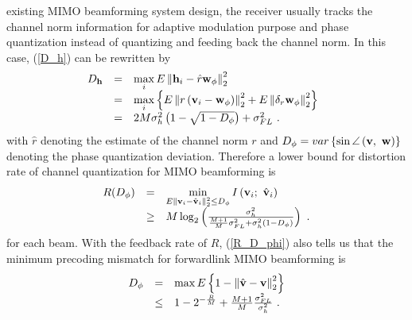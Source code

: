 \documentclass[10pt,fleqn, twocolumn]{IEEEtran}
\newcommand{\bh}{{\bf h}}
\newcommand{\bv}{{\bf v}}
\newcommand{\bw}{{\bf w}}
\begin{document}
existing MIMO beamforming system design, the receiver usually
tracks the channel norm information for adaptive modulation
purpose and phase quantization instead of quantizing and feeding
back the channel norm. In this case, (\ref{D_h}) can be rewritten
by
\begin{equation}\hspace{-0.10in}
\begin{array}{rcl}
D_{\bh}&=&\max\limits_{i}\mbox{E}\left\|\bh_{i}-\hat{r}{\bw}_{\phi}\right\|_{2}^{2}\\
&=&\max\limits_{i}\left\{\mbox{E}\left\|r\left(\bv_{i}-{\bw}_{\phi}\right)\right\|_{2}^{2}+\mbox{E}\left\|\delta_{r}{\bw}_{\phi}\right\|_{2}^{2}\right\}\\
&=&2M\sigma_{h}^{2}\left(1-\sqrt{1-D_{\phi}}\right)+\sigma_{\mbox{\tiny
FL}}^{2}\ .
\end{array}\label{D_h2}
\end{equation}
\noindent with $\hat{r}$ denoting the estimate of the channel norm
$r$ and $D_{\phi}=\mbox{var}\left\{\sin\angle\left(\bv,\
\bw\right)\right\}$ denoting the phase quantization deviation.
Therefore a lower bound for distortion rate of channel
quantization for MIMO beamforming is
\begin{equation}%
\begin{array}{rcl}
R(D_{\phi})&=&\min\limits_{E\|\bv_{i}-\hat{\bv}_{i}\|_{2}^{2}\leq
D_{\phi}} I\left(\bv_{i};\
\hat{\bv}_{i}\right)\\
&\geq&M\log_{2}\left(\frac{\sigma_{h}^{2}}{\frac{M+1}{M}\sigma_{\mbox{\tiny
FL}}^{2}+\sigma_{h}^{2}\left(1-D_{\phi}\right)}\right)\ .
\end{array}\label{R_D_phi}
\end{equation}
\noindent for each beam. With the feedback rate of $R$,
(\ref{R_D_phi}) also tells us that the minimum precoding mismatch
for forwardlink MIMO beamforming is
\begin{equation}%
\begin{array}{rcl}
D_{\phi}&=&\max\mbox{E}\left\{1-\left\|\hat{\bv}-\bv\right\|_{2}^{2}\right\}\\
 &\leq&1-2^{-\frac{R}{M}}+\frac{M+1}{M}\frac{\sigma_{\mbox{\tiny
FL}}^{2}}{\sigma_{h}^{2}}\ .
\end{array}\label{D_phi}
\end{equation}
\end{document}
